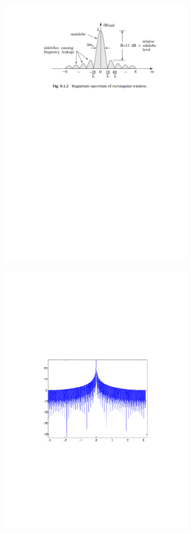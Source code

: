 \begin{frame}
\begin{figure}
  \centering
  \includegraphics[width=0.7\textwidth]{rectangularw}\\
\end{figure}
\end{frame}

\begin{frame}
\begin{figure}
  \centering
  \includegraphics[width=0.7\textwidth]{rectangularw256}\\
\end{figure}


\end{frame}

